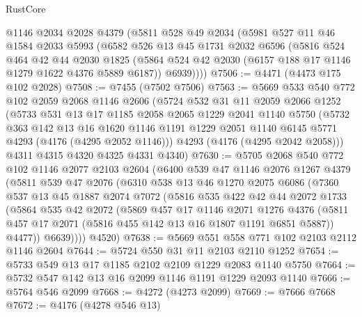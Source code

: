 \begin{lexlean}{RustCore}
\begin{coremodule}
    @1146
    @2034
    @2028
    @4379
    (@5811
      @528
      @49
      @2034
      (@5981
        @527
        @11
        @46
        @1584
        @2033
        @5993
        (@6582
          @526
          @13
          @45
          @1731
          @2032
          @6596
          (@5816
            @524
            @464
            @42
            @44
            @2030
            @1825
            (@5864 @524 @42 @2030 (@6157 @188 @17 @1146 @1279 @1622 @4376 @5889 @6187))
            @6939))))
@7506 := @4471 (@4473 @175 @102 @2028)
@7508 := @7455 (@7502 @7506)
@7563 := @5669
    @533
    @540
    @772
    @102
    @2059
    @2068
    @1146
    @2606
    (@5724
      @532
      @31
      @11
      @2059
      @2066
      @1252
      (@5733
        @531
        @13
        @17
        @1185
        @2058
        @2065
        @1229
        @2041
        @1140
        @5750
        (@5732
          @363
          @142
          @13
          @16
          @1620
          @1146
          @1191
          @1229
          @2051
          @1140
          @6145
          @5771
          @4293
          (@4176 (@4295 @2052 @1146)))
        @4293
        (@4176 (@4295 @2042 @2058)))
      @4311
      @4315
      @4320
      @4325
      @4331
      @4340)
@7630 := @5705
    @2068
    @540
    @772
    @102
    @1146
    @2077
    @2103
    @2604
    (@6400
      @539
      @47
      @1146
      @2076
      @1267
      @4379
      (@5811
        @539
        @47
        @2076
        (@6310
          @538
          @13
          @46
          @1270
          @2075
          @6086
          (@7360
            @537
            @13
            @45
            @1887
            @2074
            @7072
            (@5816
              @535
              @422
              @42
              @44
              @2072
              @1733
              (@5864
                @535
                @42
                @2072
                (@5869
                  @457
                  @17
                  @1146
                  @2071
                  @1276
                  @4376
                  (@5811 @457 @17 @2071 (@5816 @455 @142 @13 @16 @1807 @1191 @6851 @5887))
                  @4477))
              @6639))))
      @4520)
@7638 := @5669 @551 @558 @771 @102 @2103 @2112 @1146 @2604
@7644 := @5724 @550 @31 @11 @2103 @2110 @1252
@7654 := @5733 @549 @13 @17 @1185 @2102 @2109 @1229 @2083 @1140 @5750
@7664 := @5732 @547 @142 @13 @16 @2099 @1146 @1191 @1229 @2093 @1140
@7666 := @5764 @546 @2099
@7668 := @4272 (@4273 @2099)
@7669 := @7666 @7668
@7672 := @4176 (@4278 @546 @13)

\end{coremodule}
\end{lexlean}

